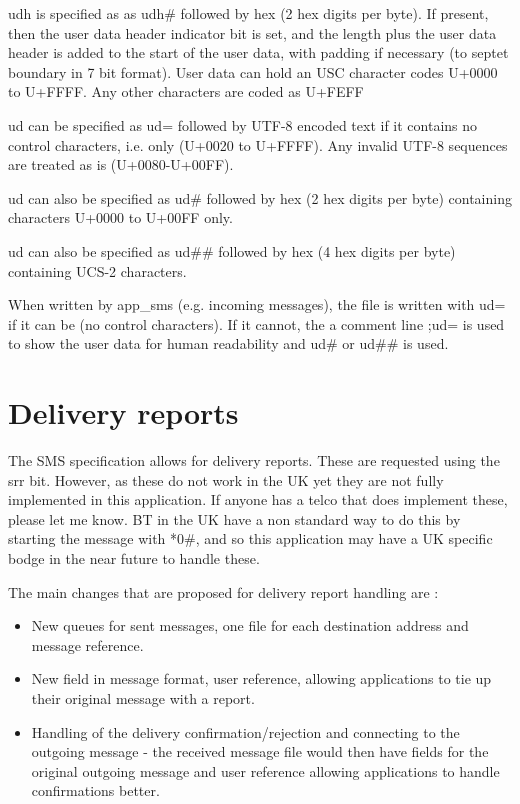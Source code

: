    udh is specified as as udh\# followed by hex (2 hex digits per byte).
   If present, then the user data header indicator bit is set, and the
   length plus the user data header is added to the start of the user
   data, with padding if necessary (to septet boundary in 7 bit format).
   User data can hold an USC character codes U+0000 to U+FFFF. Any other
   characters are coded as U+FEFF

   ud can be specified as ud= followed by UTF-8 encoded text if it
   contains no control characters, i.e. only (U+0020 to U+FFFF). Any
   invalid UTF-8 sequences are treated as is (U+0080-U+00FF).

   ud can also be specified as ud\# followed by hex (2 hex digits per
   byte) containing characters U+0000 to U+00FF only.

   ud can also be specified as ud\#\# followed by hex (4 hex digits per
   byte) containing UCS-2 characters.

   When written by app\_sms (e.g. incoming messages), the file is written
   with ud= if it can be (no control characters). If it cannot, the a
   comment line ;ud= is used to show the user data for human readability
   and ud\# or ud\#\# is used.

\section{Delivery reports}

   The SMS specification allows for delivery reports. These are requested
   using the srr bit. However, as these do not work in the UK yet they
   are not fully implemented in this application. If anyone has a telco
   that does implement these, please let me know. BT in the UK have a non
   standard way to do this by starting the message with *0\#, and so this
   application may have a UK specific bodge in the near future to handle
   these.

   The main changes that are proposed for delivery report handling are :

\begin{itemize}
     \item New queues for sent messages, one file for each destination
       address and message reference.

     \item New field in message format, user reference, allowing applications
       to tie up their original message with a report.

     \item Handling of the delivery confirmation/rejection and connecting to
       the outgoing message - the received message file would then have
       fields for the original outgoing message and user reference
       allowing applications to handle confirmations better.
\end{itemize}
